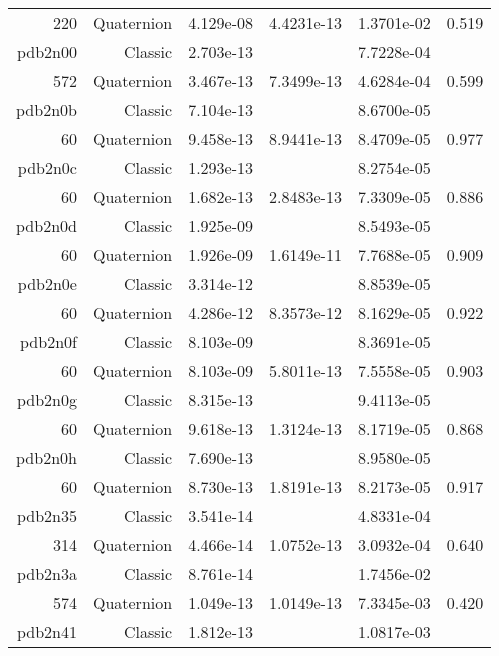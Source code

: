\begin{xltabular}{\textwidth}{r|rS[table-format=1.3e+2]S[table-format=1.4e+2]S[table-format=1.4e+2]S[table-format=-1.3]}
220 & Quaternion & 4.129e-08 & 4.4231e-13 & 1.3701e-02 & 0.519\\  \addlinespace
{\color{red} pdb2n00 } & Classic & 2.703e-13 &  & 7.7228e-04 & \\
572 & Quaternion & 3.467e-13 & 7.3499e-13 & 4.6284e-04 & 0.599\\  \addlinespace
{\color{red} pdb2n0b } & Classic & 7.104e-13 &  & 8.6700e-05 & \\
60 & Quaternion & 9.458e-13 & 8.9441e-13 & 8.4709e-05 & 0.977\\  \addlinespace
{\color{red} pdb2n0c } & Classic & 1.293e-13 &  & 8.2754e-05 & \\
60 & Quaternion & 1.682e-13 & 2.8483e-13 & 7.3309e-05 & 0.886\\  \addlinespace
{\color{red} pdb2n0d } & Classic & 1.925e-09 &  & 8.5493e-05 & \\
60 & Quaternion & 1.926e-09 & 1.6149e-11 & 7.7688e-05 & 0.909\\  \addlinespace
{\color{red} pdb2n0e } & Classic & 3.314e-12 &  & 8.8539e-05 & \\
60 & Quaternion & 4.286e-12 & 8.3573e-12 & 8.1629e-05 & 0.922\\  \addlinespace
{\color{red} pdb2n0f } & Classic & 8.103e-09 &  & 8.3691e-05 & \\
60 & Quaternion & 8.103e-09 & 5.8011e-13 & 7.5558e-05 & 0.903\\  \addlinespace
{\color{red} pdb2n0g } & Classic & 8.315e-13 &  & 9.4113e-05 & \\
60 & Quaternion & 9.618e-13 & 1.3124e-13 & 8.1719e-05 & 0.868\\  \addlinespace
{\color{red} pdb2n0h } & Classic & 7.690e-13 &  & 8.9580e-05 & \\
60 & Quaternion & 8.730e-13 & 1.8191e-13 & 8.2173e-05 & 0.917\\  \addlinespace
{\color{red} pdb2n35 } & Classic & 3.541e-14 &  & 4.8331e-04 & \\
314 & Quaternion & 4.466e-14 & 1.0752e-13 & 3.0932e-04 & 0.640\\  \addlinespace
{\color{red} pdb2n3a } & Classic & 8.761e-14 &  & 1.7456e-02 & \\
574 & Quaternion & 1.049e-13 & 1.0149e-13 & 7.3345e-03 & 0.420\\  \addlinespace
{\color{red} pdb2n41 } & Classic & 1.812e-13 &  & 1.0817e-03 & \\

\end{xltabular}

